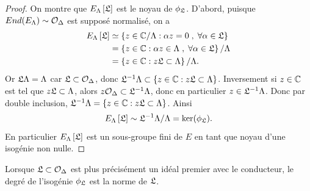 \begin{proof}
	On montre que $E_{\Lambda}\left[ \mathfrak{L}\right]$ est le noyau de $\phi_{\mathfrak{L}}$. D'abord, puisque $End(E_{\Lambda}) \sim \mathcal{O}_{\Delta}$ est supposé normalisé, on a
	\begin{align*}
		E_{\Lambda}\left[ \mathfrak{L}\right]&\simeq \left\lbrace z\in\mathbb{C}/\Lambda : \alpha z = 0 \;,\; \forall\alpha\in\mathfrak{L}\right\rbrace \\
		&=\left\lbrace z\in\mathbb{C} : \alpha z\in\Lambda \;,\;\forall\alpha\in\mathfrak{L}\right\rbrace / \Lambda\\
		&=\left\lbrace z\in\mathbb{C} : z\mathfrak{L}\subset\Lambda\right\rbrace / \Lambda.
	\end{align*}
	Or $\mathfrak{L}\Lambda = \Lambda$ car $\mathfrak{L}\subset\mathcal{O}_{\Delta}$, donc $ \mathfrak{L}^{-1}\Lambda \subset \left\lbrace z\in\mathbb{C} : z\mathfrak{L}\subset\Lambda\right\rbrace $. Inversement si $z\in\mathbb{C}$ est tel que $z\mathfrak{L}\subset\Lambda$, alors $z\mathcal{O}_{\Delta}\subset\mathfrak{L}^{-1}\Lambda$, donc en particulier $z\in\mathfrak{L}^{-1}\Lambda$. Donc par double inclusion, $ \mathfrak{L}^{-1}\Lambda = \left\lbrace z\in\mathbb{C} : z\mathfrak{L}\subset\Lambda\right\rbrace $. Ainsi
	\begin{equation*}
		E_{\Lambda}\left[ \mathfrak{L}\right]\sim\mathfrak{L}^{-1}\Lambda/\Lambda = \ker(\phi_{\mathfrak{L}}).
	\end{equation*}
	En particulier $E_{\Lambda}\left[ \mathfrak{L}\right]$ est un sous-groupe fini de $E$ en tant que noyau d'une isogénie non nulle. 
	
\end{proof}

Lorsque $\mathfrak{L}\subset\mathcal{O}_{\Delta}$ est plus précisément un idéal premier avec le conducteur, le degré de l'isogénie $\phi_{\mathfrak{L}}$ est la norme de $\mathfrak{L}$. 

